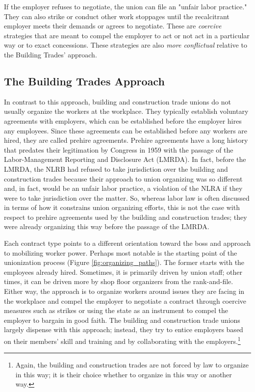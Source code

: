 \documentclass[12pt]{article}
\begin{document}
If the employer refuses to negotiate, the union can file an "unfair labor practice." They can also strike or conduct other work stoppages until the recalcitrant employer meets their demands or agrees to negotiate. These are \textit{coercive} strategies that are meant to compel the employer to act or not act in a particular way or to exact concessions. These strategies are also \textit{more conflictual} relative to the Building Trades' approach.

\subsection{The Building Trades Approach}

In contrast to this approach, building and construction trade unions do not usually organize the workers at the workplace. They typically establish voluntary agreements with employers, which can be established before the employer hires any employees. Since these agreements can be established before any workers are hired, they are called prehire agreements. Prehire agreements have a long history that predates their legitimation by Congress in 1959 with the passage of the Labor-Management Reporting and Disclosure Act (LMRDA). In fact, before the LMRDA, the NLRB had refused to take jurisdiction over the building and construction trades because their approach to union organizing was so different and, in fact, would be an unfair labor practice, a violation of the NLRA if they were to take jurisdiction over the matter. So, whereas labor law is often discussed in terms of how it constrains union organizing efforts, this is not the case with respect to prehire agreements used by the building and construction trades; they were already organizing this way before the passage of the LMRDA.

Each contract type points to a different orientation toward the boss and approach to mobilizing worker power. Perhaps most notable is the starting point of the unionization process (Figure \ref{fig:organizing_paths}). The former starts with the employees already hired. Sometimes, it is primarily driven by union staff; other times, it can be driven more by shop floor organizers from the rank-and-file. Either way, the approach is to organize workers around issues they are facing in the workplace and compel the employer to negotiate a contract through coercive measures such as strikes or using the state as an instrument to compel the employer to bargain in good faith. The building and construction trade unions largely dispense with this approach; instead, they try to entice employers based on their members’ skill and training and by collaborating with the employers.\footnote{Again, the building and construction trades are not forced by law to organize in this way; it is their choice whether to organize in this way or another way.}
\end{document}
